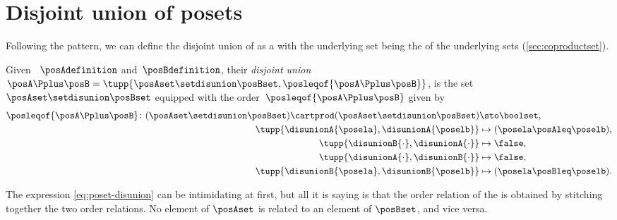 
\section{Disjoint union of posets}

Following the pattern, we can define the disjoint union of  as a  with the underlying set being the  of the underlying sets (\cref{sec:coproductset}).
\begin{definition}
    \label{def:disjoint-union-of-posets}
    Given ~$\posAdefinition$ and~$\posBdefinition$, their \emph{disjoint union}~$\posA\Pplus\posB=\tupp{\posAset \setdisunion \posBset, {{\posleqof{\posA \Pplus \posB}}}}$, is the set $\posAset \setdisunion \posBset$ equipped with the order~$\posleqof{\posA \Pplus \posB}$ given by
    \begin{equation} \label{eq:poset-disunion}
        \begin{aligned}
            \posleqof{\posA\Pplus\posB}\colon
            (\posAset\setdisunion\posBset)\cartprod (\posAset
            \setdisunion\posBset)                           & \sto \boolset, \\
            \tupp{\disunionA{\posela},\disunionA{\poselb} } &
            \mapsto (\posela\posAleq \poselb), \\
            \tupp{\disunionB{\cdot},\disunionA{\cdot} }     &
            \mapsto \false, \\
            \tupp{\disunionA{\cdot},\disunionB{\cdot}}      &
            \mapsto \false, \\
            \tupp{\disunionB{\posela},\disunionB{\poselb}}  &
            \mapsto (\posela\posBleq \poselb).
        \end{aligned}
    \end{equation}
\end{definition}

The expression \cref{eq:poset-disunion} can be intimidating at first, but all it is saying is that the order relation of the  is obtained by stitching together the two order relations.
No element of $\posAset$ is related to an element of $\posBset$, and vice versa.

